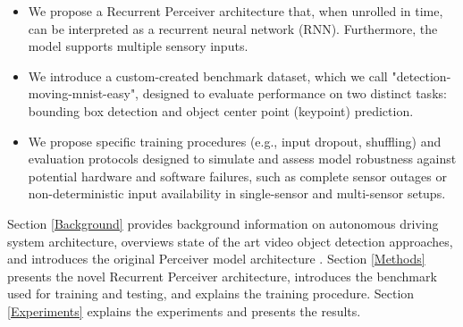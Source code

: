 \begin{itemize}
    \item We propose a Recurrent Perceiver architecture that, when unrolled in time, can be interpreted as a recurrent neural network (RNN). Furthermore, the model supports multiple sensory inputs.
    \item We introduce a custom-created benchmark dataset, which we call "detection-moving-mnist-easy", designed to evaluate performance on two distinct tasks: bounding box detection and object center point (keypoint) prediction.    
    \item We propose specific training procedures (e.g., input dropout, shuffling) and evaluation protocols designed to simulate and assess model robustness against potential hardware and software failures, such as complete sensor outages or non-deterministic input availability in single-sensor and multi-sensor setups.
\end{itemize}

Section \ref{Background} provides background information on autonomous driving system architecture, overviews state of the art video object detection approaches, and introduces the original Perceiver model architecture \cite{jaeglePerceiverGeneralPerception2021}. Section \ref{Methods} presents the novel Recurrent Perceiver architecture, introduces the benchmark used for training and testing, and explains the training procedure. Section \ref{Experiments} explains the experiments and presents the results.



